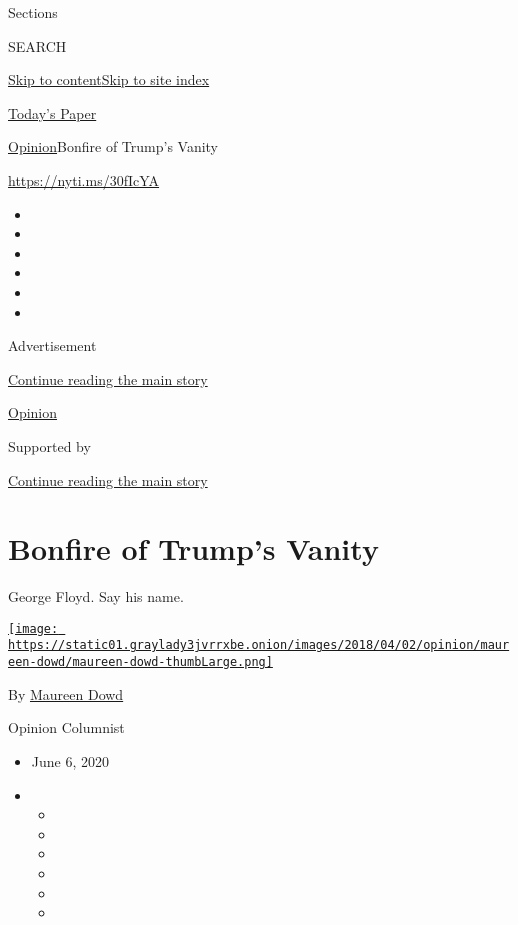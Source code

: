 Sections

SEARCH

\protect\hyperlink{site-content}{Skip to
content}\protect\hyperlink{site-index}{Skip to site index}

\href{https://myaccount.nytimes3xbfgragh.onion/auth/login?response_type=cookie\&client_id=vi}{}

\href{https://www.nytimes3xbfgragh.onion/section/todayspaper}{Today's
Paper}

\href{/section/opinion}{Opinion}\textbar{}Bonfire of Trump's Vanity

\href{https://nyti.ms/30fIcYA}{https://nyti.ms/30fIcYA}

\begin{itemize}
\item
\item
\item
\item
\item
\item
\end{itemize}

Advertisement

\protect\hyperlink{after-top}{Continue reading the main story}

\href{/section/opinion}{Opinion}

Supported by

\protect\hyperlink{after-sponsor}{Continue reading the main story}

\hypertarget{bonfire-of-trumps-vanity}{%
\section{Bonfire of Trump's Vanity}\label{bonfire-of-trumps-vanity}}

George Floyd. Say his name.

\href{https://www.nytimes3xbfgragh.onion/by/maureen-dowd}{\texttt{[image: https://static01.graylady3jvrrxbe.onion/images/2018/04/02/opinion/maureen-dowd/maureen-dowd-thumbLarge.png]}}

By \href{https://www.nytimes3xbfgragh.onion/by/maureen-dowd}{Maureen
Dowd}

Opinion Columnist

\begin{itemize}
\item
  June 6, 2020
\item
  \begin{itemize}
  \item
  \item
  \item
  \item
  \item
  \item
  \end{itemize}
\end{itemize}

